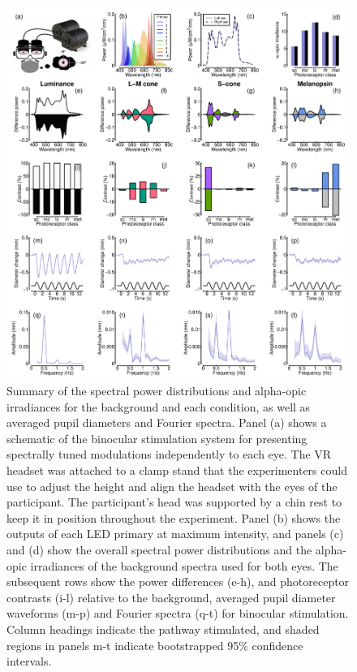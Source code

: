 \documentclass[
]{article}
\begin{document}
\begin{figure}

{\centering \includegraphics[width=0.8\linewidth]{Figures/methodsfig} 

}

\caption{Summary of the spectral power distributions and alpha-opic irradiances for the background and each condition, as well as averaged pupil diameters and Fourier spectra. Panel (a) shows a schematic of the binocular stimulation system for presenting spectrally tuned modulations independently to each eye. The VR headset was attached to a clamp stand that the experimenters could use to adjust the height and align the headset with the eyes of the participant. The participant's head was supported by a chin rest to keep it in position throughout the experiment. Panel (b) shows the outputs of each LED primary at maximum intensity, and panels (c) and (d) show the overall spectral power distributions and the alpha-opic irradiances of the background spectra used for both eyes. The subsequent rows show the power differences (e-h), and photoreceptor contrasts (i-l) relative to the background, averaged pupil diameter waveforms (m-p) and Fourier spectra (q-t) for binocular stimulation. Column headings indicate the pathway stimulated, and shaded regions in panels m-t indicate bootstrapped 95\% confidence intervals.}\label{fig:spectraplots}
\end{figure}
\end{document}
